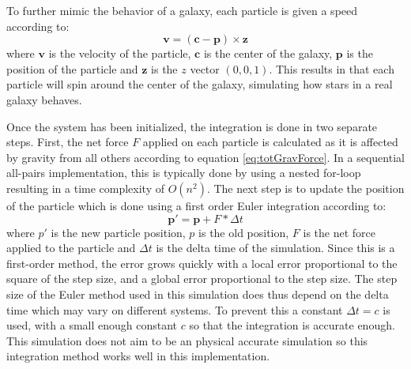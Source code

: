 To further mimic the behavior of a galaxy, each particle is given a speed according to:
\begin{equation}
    \boldsymbol v = (\boldsymbol c - \boldsymbol p) \times  \boldsymbol z
\end{equation}
\noindent where $\boldsymbol v$ is the velocity of the particle, $\boldsymbol c$ is the center of the galaxy, $\boldsymbol p$ is the position of the particle and $\boldsymbol z$ is the $z$ vector $(0, 0, 1)$. This results in that each particle will spin around the center of the galaxy, simulating how stars in a real galaxy behaves.

Once the system has been initialized, the integration is done in two separate steps. First, the net force $F$ applied on each particle is calculated as it is affected by gravity from all others according to equation \ref{eq:totGravForce}. In a sequential all-pairs implementation, this is typically done by using a nested for-loop resulting in a time complexity of $O(n^2)$. The next step is to update the position of the particle which is done using a first order Euler integration according to:
\begin{equation} \label{eq:EulerIntegrationPosition}
    \boldsymbol p' = \boldsymbol p + F * \Delta t
\end{equation}
\noindent where $p'$ is the new particle position, $p$ is the old position, $F$ is the net force applied to the particle and $\Delta t$ is the delta time of the simulation.
Since this is a first-order method, the error grows quickly with a local error proportional to the square of the step size, and a global error proportional to the step size. The step size of the Euler method used in this simulation does thus depend on the delta time which may vary on different systems. To prevent this a constant $\Delta t = c$ is used, with a small enough constant $c$ so that the integration is accurate enough. This simulation does not aim to be an physical accurate simulation so this integration method works well in this implementation.


